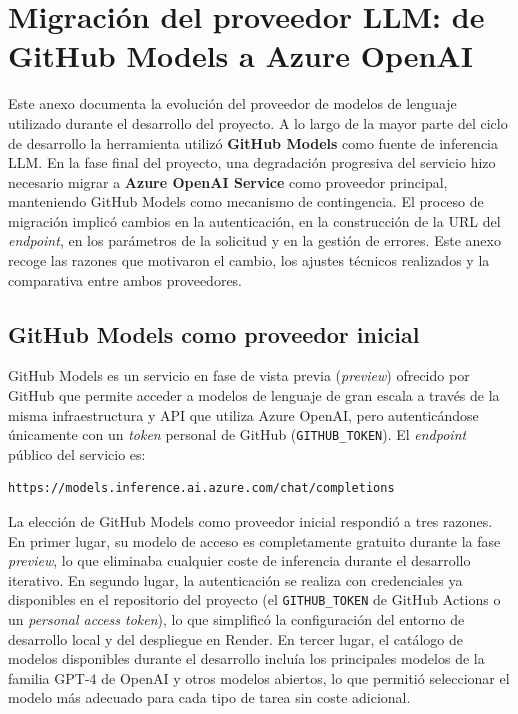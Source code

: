 
\chapter{Migración del proveedor LLM: de GitHub Models a Azure OpenAI}
\label{anx:migracionLLM}

Este anexo documenta la evolución del proveedor de modelos de lenguaje utilizado durante el desarrollo del proyecto. A lo largo de la mayor parte del ciclo de desarrollo la herramienta utilizó \textbf{GitHub Models} como fuente de inferencia LLM. En la fase final del proyecto, una degradación progresiva del servicio hizo necesario migrar a \textbf{Azure OpenAI Service} como proveedor principal, manteniendo GitHub Models como mecanismo de contingencia. El proceso de migración implicó cambios en la autenticación, en la construcción de la URL del \textit{endpoint}, en los parámetros de la solicitud y en la gestión de errores. Este anexo recoge las razones que motivaron el cambio, los ajustes técnicos realizados y la comparativa entre ambos proveedores.

\section{GitHub Models como proveedor inicial}
\label{sec:anx2-githubmodels}

GitHub Models es un servicio en fase de vista previa (\textit{preview}) ofrecido por GitHub que permite acceder a modelos de lenguaje de gran escala a través de la misma infraestructura y API que utiliza Azure OpenAI, pero autenticándose únicamente con un \textit{token} personal de GitHub (\texttt{GITHUB\_TOKEN}). El \textit{endpoint} público del servicio es:

\begin{lstlisting}[style=promptbox]
https://models.inference.ai.azure.com/chat/completions
\end{lstlisting}

La elección de GitHub Models como proveedor inicial respondió a tres razones. En primer lugar, su modelo de acceso es completamente gratuito durante la fase \textit{preview}, lo que eliminaba cualquier coste de inferencia durante el desarrollo iterativo. En segundo lugar, la autenticación se realiza con credenciales ya disponibles en el repositorio del proyecto (el \texttt{GITHUB\_TOKEN} de GitHub Actions o un \textit{personal access token}), lo que simplificó la configuración del entorno de desarrollo local y del despliegue en Render. En tercer lugar, el catálogo de modelos disponibles durante el desarrollo incluía los principales modelos de la familia GPT-4 de OpenAI y otros modelos abiertos, lo que permitió seleccionar el modelo más adecuado para cada tipo de tarea sin coste adicional.

